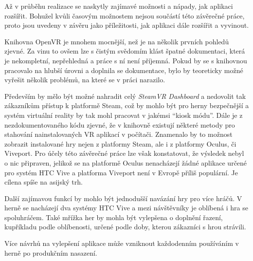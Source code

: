 Až v průběhu realizace se naskytly zajímavé možnosti a nápady, jak
aplikaci rozšířit. Bohužel kvůli časovým možnostem nejsou součástí této
závěrečné práce, proto jsou uvedeny v závěru jako příležitosti, jak
aplikaci dále rozšířit a vyvinout.

Knihovna OpenVR je mnohem mocnější, než je na několik prvních pohledů
zjevné. Za vinu to ovšem lze s čistým svědomím klást špatné dokumentaci,
která je nekompletní, nepřehledná a práce s ní není příjemná. Pokud by
se s knihovnou pracovalo na hlubší úrovni a doplnila se dokumentace,
bylo by teoreticky možné vyřešit několik problémů, na které se v práci
narazilo.

Především by mělo být možné nahradit celý \emph{SteamVR Dashboard} a
nedovolit tak zákazníkům přístup k platformě Steam, což by mohlo být pro
herny bezpečnější a systém virtuální reality by tak mohl pracovat v
jakémsi ``kiosk módu''. Dále je z nezdokumentovaného kódu zjevné, že v
knihovně existují některé metody pro stahování nainstalovaných VR
aplikací v počítači. Znamenalo by to možnost zobrazit instalované hry
nejen z platformy Steam, ale i z platformy Oculus, či Viveport. Pro
účely této závěrečné práce lze však konstatovat, že výsledek nebyl o nic
připraven, jelikož se na platformě Oculus nenacházejí žádné aplikace
určené pro systém HTC Vive a platforma Viveport není v Evropě příliš
populární. Je cílena spíše na asijský trh.

Další zajímavou funkcí by mohlo být jednodušší navázání hry pro více
hráčů. V herně se nacházejí dva systémy HTC Vive a mezi návštěvníky je
oblíbená i hra se spoluhráčem. Také mřížka her by mohla být vylepšena o
doplnění řazení, kupříkladu podle oblíbenosti, určené podle doby, kterou
zákazníci s hrou strávili.

Více návrhů na vylepšení aplikace může vzniknout každodenním používáním
v herně po produkčním nasazení.
